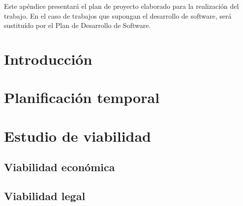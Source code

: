 
Este apéndice presentará el plan de proyecto elaborado para la realización del trabajo. En el caso de trabajos que supongan el desarrollo de software, será sustituído por el Plan de Desarrollo de Software.

\section{Introducción}

\section{Planificación temporal}

\section{Estudio de viabilidad}

\subsection{Viabilidad económica}

\subsection{Viabilidad legal}


